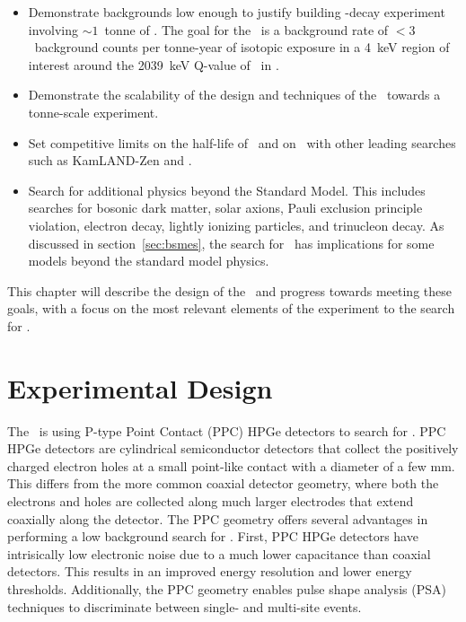 \documentclass[/main.tex]{subfiles}
\begin{document}
\begin{itemize}
\item Demonstrate backgrounds low enough to justify building \bb -decay experiment involving $\sim1$~tonne of . The goal for the \MJD\ is a background rate of $<3$~background counts per tonne-year of isotopic exposure in a 4~keV region of interest around the 2039~keV Q-value of \znbb\ in .
\item Demonstrate the scalability of the design and techniques of the \MJD\ towards a tonne-scale experiment.
\item Set competitive limits on the half-life of \znbb\ and on \mbb\ with other leading searches such as KamLAND-Zen and \Gerda \cite{kamlandzen, gerda}.
\item Search for additional physics beyond the Standard Model. This includes searches for bosonic dark matter, solar axions, Pauli exclusion principle violation, electron decay, lightly ionizing particles, and trinucleon decay\cite{mjdlowE2017, mjdlips2019, mjdtrinuc2019}. As discussed in section~\ref{sec:bsmes}, the search for \bbes\ has implications for some models beyond the standard model physics.
\end{itemize}
This chapter will describe the design of the \MJD\ and progress towards meeting these goals, with a focus on the most relevant elements of the experiment to the search for \bbes.

\section{Experimental Design}
The \MJD\ is using P-type Point Contact (PPC)\cite{Luke1989, Barbeau2007} HPGe detectors to search for \znbb.
PPC HPGe detectors are cylindrical semiconductor detectors that collect the positively charged electron holes at a small point-like contact with a diameter of a few mm.
This differs from the more common coaxial detector geometry, where both the electrons and holes are collected along much larger electrodes that extend coaxially along the detector.
The PPC geometry offers several advantages in performing a low background search for \znbb.
First, PPC HPGe detectors have intrisically low electronic noise due to a much lower capacitance than coaxial detectors.
This results in an improved energy resolution and lower energy thresholds.
Additionally, the PPC geometry enables pulse shape analysis (PSA) techniques to discriminate between single- and multi-site events.
\\
\end{document}
